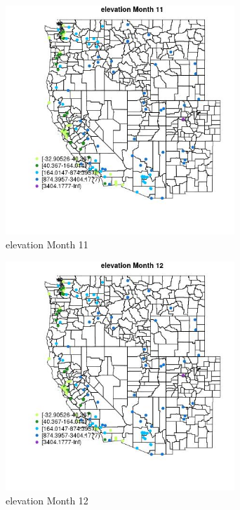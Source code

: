 \begin{figure} 
\centering  
\includegraphics[width=0.77\textwidth]{Code_Outputs/Report_ML_input_PM25_Step4_part_e_de_duplicated_aves_MapObsMo11elevation.jpg} 
\caption{\label{fig:Report_ML_input_PM25_Step4_part_e_de_duplicated_avesMapObsMo11elevation}elevation Month 11} 
\end{figure} 
 

\clearpage 

\begin{figure} 
\centering  
\includegraphics[width=0.77\textwidth]{Code_Outputs/Report_ML_input_PM25_Step4_part_e_de_duplicated_aves_MapObsMo12elevation.jpg} 
\caption{\label{fig:Report_ML_input_PM25_Step4_part_e_de_duplicated_avesMapObsMo12elevation}elevation Month 12} 
\end{figure} 
 

